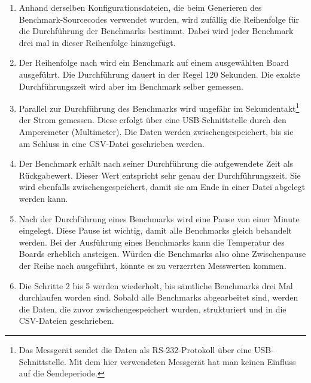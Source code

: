 \begin{enumerate}
\item Anhand derselben Konfigurationsdateien, die beim Generieren des Benchmark-Sourceco\-des verwendet wurden, wird zufällig die Reihenfolge für die Durchführung der Benchmarks bestimmt. Dabei wird jeder Benchmark drei mal in dieser Reihenfolge hinzugefügt.
\item Der Reihenfolge nach wird ein Benchmark auf einem ausgewählten Board ausgeführt. Die Durchführung dauert in der Regel 120 Sekunden. Die exakte Durchführungszeit wird aber im Benchmark selber gemessen.
\item Parallel zur Durchführung des Benchmarks wird ungefähr im Sekundentakt\footnote{Das Messgerät sendet die Daten als RS-232-Protokoll über eine USB-Schnittstelle. Mit dem hier verwendeten Messgerät hat man keinen Einfluss auf die Sendeperiode.} der Strom gemessen. Diese erfolgt über eine USB-Schnittstelle durch den Amperemeter (Multimeter). Die Daten werden zwischengespeichert, bis sie am Schluss in eine CSV-Datei geschrieben werden.
\item Der Benchmark erhält nach seiner Durchführung die aufgewendete Zeit als Rückgabewert. Dieser Wert entspricht sehr genau der Durchführungszeit. Sie wird ebenfalls zwischengespeichert, damit sie am Ende in einer Datei abgelegt werden kann.
\item Nach der Durchführung eines Benchmarks wird eine Pause von einer Minute eingelegt. Diese Pause ist wichtig, damit alle Benchmarks gleich behandelt werden. Bei der Ausführung eines Benchmarks kann die Temperatur des Boards erheblich ansteigen. Würden die Benchmarks also ohne Zwischenpause der Reihe nach ausgeführt, könnte es zu verzerrten Messwerten kommen.
\item Die Schritte 2 bis 5 werden wiederholt, bis sämtliche Benchmarks drei Mal durchlaufen worden sind. Sobald alle Benchmarks abgearbeitet sind, werden die Daten, die zuvor zwischengespeichert wurden, strukturiert und in die CSV-Dateien geschrieben.
\end{enumerate}